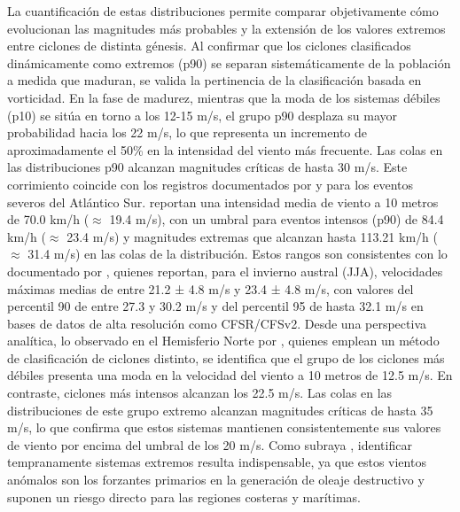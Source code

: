 La cuantificación de estas distribuciones permite comparar objetivamente cómo evolucionan las magnitudes más probables y la extensión de los valores extremos entre ciclones de distinta génesis. Al confirmar que los ciclones clasificados dinámicamente como extremos (p90) se separan sistemáticamente de la población a medida que maduran, se valida la pertinencia de la clasificación basada en vorticidad. En la fase de madurez, mientras que la moda de los sistemas débiles (p10) se sitúa en torno a los 12-15 m/s, el grupo p90 desplaza su mayor probabilidad hacia los 22 m/s, lo que representa un incremento de aproximadamente el 50\% en la intensidad del viento más frecuente. Las colas en las distribuciones p90 alcanzan magnitudes críticas de hasta 30 m/s. Este corrimiento coincide con los registros documentados por \citet{padilhareinke2026characterization} y \citet{gramcianinov2020analysis} para los eventos severos del Atlántico Sur. \citet{padilhareinke2026characterization} reportan una intensidad media de viento a 10 metros de 70.0 km/h ($\approx$ 19.4 m/s), con un umbral para eventos intensos (p90) de 84.4 km/h ($\approx$ 23.4 m/s) y magnitudes extremas que alcanzan hasta 113.21 km/h ($\approx$ 31.4 m/s) en las colas de la distribución. Estos rangos son consistentes con lo documentado por \citet{gramcianinov2020analysis}, quienes reportan, para el invierno austral (JJA), velocidades máximas medias de entre 21.2 ± 4.8 m/s y 23.4 ± 4.8 m/s, con valores del percentil 90 de entre 27.3 y 30.2 m/s y del percentil 95 de hasta 32.1 m/s en bases de datos de alta resolución como CFSR/CFSv2. Desde una perspectiva analítica, lo observado en el Hemisferio Norte por \citet{corner2025classification}, quienes emplean un método de clasificación de ciclones distinto, se identifica que el grupo de los ciclones más débiles presenta una moda en la velocidad del viento a 10 metros de 12.5 m/s. En contraste, ciclones más intensos alcanzan los 22.5 m/s. Las colas en las distribuciones de este grupo extremo alcanzan magnitudes críticas de hasta 35 m/s, lo que confirma que estos sistemas mantienen consistentemente sus valores de viento por encima del umbral de los 20 m/s.
%
Como subraya \citet{gramcianinov2023impact}, identificar tempranamente sistemas extremos resulta indispensable, ya que estos vientos anómalos son los forzantes primarios en la generación de oleaje destructivo y suponen un riesgo directo para las regiones costeras y marítimas.

